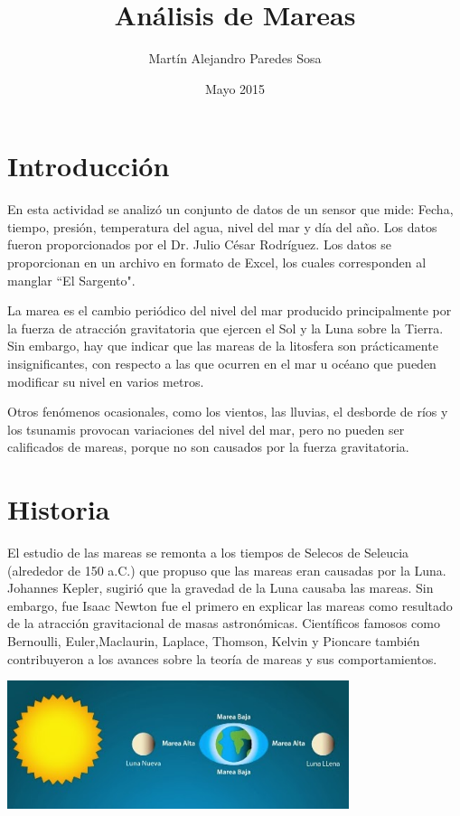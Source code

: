 \documentclass[12pt]{article}
\title{Análisis de Mareas}
\author{Martín Alejandro Paredes Sosa}
\date{Mayo 2015}
\begin{document}
\maketitle

\section{Introducción}
En esta actividad se analizó un conjunto de datos de un sensor que mide: Fecha, tiempo, presión, temperatura del agua, nivel del mar y día del año. Los datos fueron proporcionados por el Dr. Julio César Rodríguez. Los datos se proporcionan en un archivo en formato de Excel, los cuales corresponden al manglar ``El Sargento". 

	La marea es el cambio periódico del nivel del mar producido principalmente por la fuerza de atracción gravitatoria que ejercen el Sol y la Luna sobre la Tierra. Sin embargo, hay que indicar que las mareas de la litosfera son prácticamente insignificantes, con respecto a las que ocurren en el mar u océano que pueden modificar su nivel en varios metros.
	
	Otros fenómenos ocasionales, como los vientos, las lluvias, el desborde de ríos y los tsunamis provocan variaciones del nivel del mar, pero no pueden ser calificados de mareas, porque no son causados por la fuerza gravitatoria.

\section{Historia}
El estudio de las mareas se remonta a los tiempos de Selecos de Seleucia (alrededor de 150 a.C.) que propuso que las mareas eran causadas por la Luna. Johannes Kepler, sugirió que la gravedad de la Luna causaba las mareas. Sin embargo, fue Isaac Newton fue el primero en explicar las mareas como resultado de la atracción gravitacional de masas astronómicas. Científicos famosos como Bernoulli, Euler,Maclaurin, Laplace, Thomson, Kelvin y Pioncare también contribuyeron a los avances sobre la teoría de mareas y sus comportamientos.
\begin{center}
\includegraphics[width=10cm]{1mareas.png}
\end{center}
\end{document}
